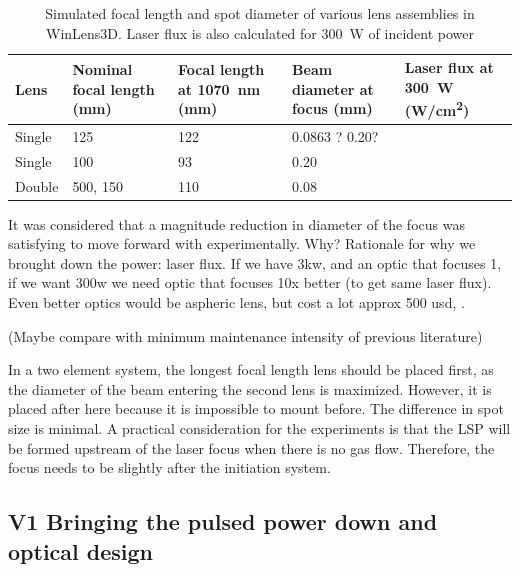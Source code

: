             \begin{table}[!ht]
                \centering
                \caption{Simulated focal length and spot diameter of various lens assemblies in WinLens3D. Laser flux is also calculated for \qty{300}{W} of incident power}
                \label{tab:laser flux}
                \begin{tabularx}{\textwidth}{@{}lX<{\raggedright}X<{\raggedright}X<{\raggedright}X<{\raggedright}@{}}
                \toprule
                Lens & Nominal focal length (\unit{mm}) & Focal length at \qty{1070}{nm} (\unit{mm})& Beam diameter at focus (\unit{mm}) & Laser flux at \qty{300}{W} (\unit{W/cm^2}) \\ \midrule
                Single & 125           &  122   &    0.0863 ?  0.20?     &  \\
                Single & 100           &  93   &    0.20   &  \\
                Double & 500, 150      &  110    &    0.08   &  \\
                \bottomrule
                \end{tabularx}
            \end{table}

            It was considered that a magnitude reduction in diameter of the focus was satisfying to move forward with experimentally. Why? Rationale for why we brought down the power: laser flux. If we have 3kw, and an optic that focuses 1, if we want 300w we need optic that focuses 10x better (to get same laser flux). Even better optics would be aspheric lens, but cost a lot approx 500 usd, .

            (Maybe compare with minimum maintenance intensity of previous literature)

            In a two element system, the longest focal length lens should be placed first, as the diameter of the beam entering the second lens is maximized. However, it is placed after here because it is impossible to mount before. The difference in spot size is minimal. A practical consideration for the experiments is that the LSP will be formed upstream of the laser focus when there is no gas flow. Therefore, the focus needs to be slightly after the initiation system.

        \subsection{V1 Bringing the pulsed power down and optical design} \label{sec:pulse_power_down_V1}

